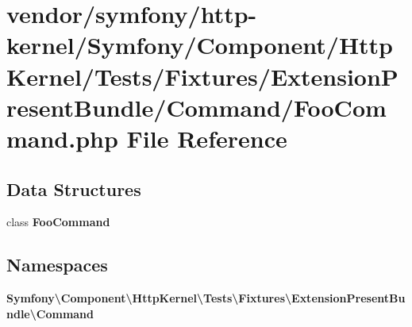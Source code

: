 \section{vendor/symfony/http-\/kernel/\+Symfony/\+Component/\+Http\+Kernel/\+Tests/\+Fixtures/\+Extension\+Present\+Bundle/\+Command/\+Foo\+Command.php File Reference}
\label{http-kernel_2_symfony_2_component_2_http_kernel_2_tests_2_fixtures_2_extension_present_bundle_2_command_2_foo_command_8php}
\subsection*{Data Structures}
\begin{DoxyCompactItemize}
\item 
class {\bf Foo\+Command}
\end{DoxyCompactItemize}
\subsection*{Namespaces}
\begin{DoxyCompactItemize}
\item 
 {\bf Symfony\textbackslash{}\+Component\textbackslash{}\+Http\+Kernel\textbackslash{}\+Tests\textbackslash{}\+Fixtures\textbackslash{}\+Extension\+Present\+Bundle\textbackslash{}\+Command}
\end{DoxyCompactItemize}
